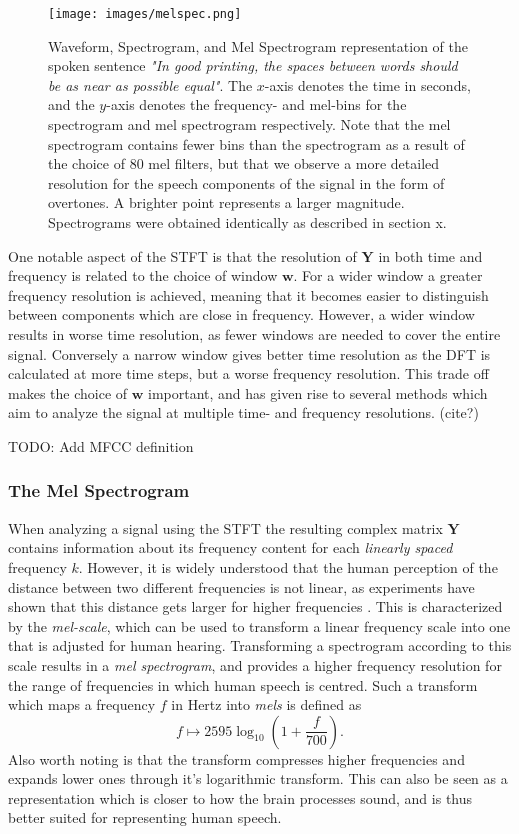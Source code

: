 \documentclass{article}
\begin{document}
\begin{figure}[H]
    \centering
    \texttt{[image: images/melspec.png]}
    \caption{\onehalfspacing Waveform, Spectrogram, and Mel Spectrogram representation of the spoken sentence \textit{"In good printing, the spaces between words should be as near as possible equal"}. The $x$-axis denotes the time in seconds, and the $y$-axis denotes the frequency- and mel-bins for the spectrogram and mel spectrogram respectively. Note that the mel spectrogram contains fewer bins than the spectrogram as a result of the choice of 80 mel filters, but that we observe a more detailed resolution for the speech components of the signal in the form of overtones. A brighter point represents a larger magnitude. Spectrograms were obtained identically as described in section x.}
    \label{fig:melspec}
\end{figure}

One notable aspect of the STFT is that the resolution of $\bm{Y}$ in both time and frequency is related to the choice of window $\bm{w}$. For a wider window a greater frequency resolution is achieved, meaning that it becomes easier to distinguish between components which are close in frequency. However, a wider window results in worse time resolution, as fewer windows are needed to cover the entire signal. Conversely a narrow window gives better time resolution as the DFT is calculated at more time steps, but a worse frequency resolution. This trade off makes the choice of $\bm{w}$ important, and has given rise to  several methods which aim to analyze the signal at multiple time- and frequency resolutions. (cite?)

TODO: Add MFCC definition

\subsubsection{The Mel Spectrogram} \label{sec:melspec}
When analyzing a signal using the STFT the resulting complex matrix $\bm{Y}$ contains information about its frequency content for each \textit{linearly spaced} frequency $k$. However, it is widely understood that the human perception of the distance between two different frequencies is not linear, as experiments have shown that this distance gets larger for higher frequencies \cite{stevens1937scale}. This is characterized by the \textit{mel-scale}, which can be used to transform a linear frequency scale into one that is adjusted for human hearing. Transforming a spectrogram according to this scale results in a \textit{mel spectrogram}, and provides a higher frequency resolution for the range of frequencies in which human speech is centred. Such a transform which maps a frequency $f$ in Hertz into \textit{mels} is defined as
\begin{equation}
    f \longmapsto 2595 \log_{10} \left( 1 + \frac{f}{700} \right).
\end{equation}
Also worth noting is that the transform compresses higher frequencies and expands lower ones through it's logarithmic transform. This can also be seen as a representation which is closer to how the brain processes sound, and is thus better suited for representing human speech.
\end{document}
